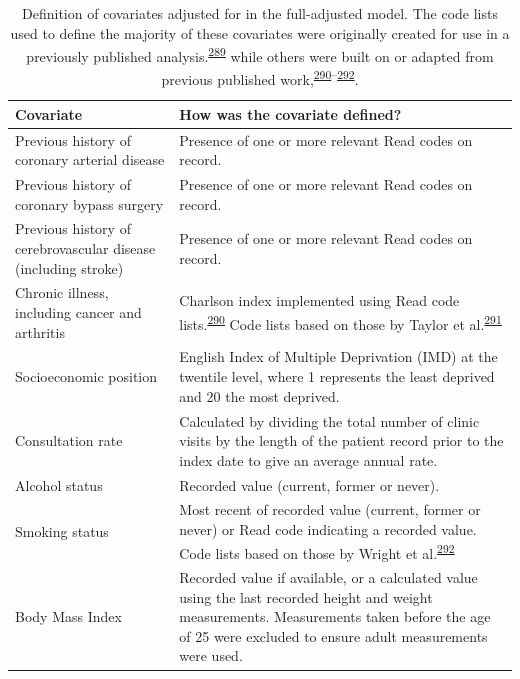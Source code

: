 \documentclass[a4paper, twoside]{templates/ociamthesis}
\begin{document}
\begin{table}[H]

\caption[Covariates adjusted for.]{\label{tab:covariateDef-table}Definition of covariates adjusted for in the full-adjusted model. The code lists used to define the majority of these covariates were originally created for use in a previously published analysis.\textsuperscript{\protect\hyperlink{ref-walker2020}{289}} while others were built on or adapted from previous published work,\textsuperscript{\protect\hyperlink{ref-khan2010}{290}--\protect\hyperlink{ref-wright2017}{292}}.}
\centering
\fontsize{9}{11}\selectfont
\begin{tabular}[t]{>{\raggedright\arraybackslash}p{15em}>{\centering\arraybackslash}p{25em}}
\toprule
\textbf{Covariate } & \textbf{How was the covariate defined?}\\
\midrule
Previous history of coronary arterial disease & Presence of one or more relevant Read codes on record.\\
\midrule
Previous history of coronary bypass surgery & Presence of one or more relevant Read codes on record.\\
\midrule
Previous history of cerebrovascular disease (including stroke) & Presence of one or more relevant Read codes on record.\\
\midrule
Chronic illness, including cancer and arthritis & Charlson index implemented using Read code lists.\textsuperscript{\protect\hyperlink{ref-khan2010}{290}} Code lists based on those by Taylor et al.\textsuperscript{\protect\hyperlink{ref-taylor2016}{291}}\\
\midrule
Socioeconomic position & 2010 English Index of Multiple Deprivation (IMD) at the twentile level, where 1 represents the least deprived and 20 the most deprived.\\
\midrule
\addlinespace
Consultation rate & Calculated by dividing the total number of clinic visits by the length of the patient record prior to the index date to give an average annual rate.\\
\midrule
Alcohol status & Recorded value (current, former or never).\\
\midrule
Smoking status & Most recent of recorded value (current, former or never) or Read code indicating a recorded value. Code lists based on those by Wright et al.\textsuperscript{\protect\hyperlink{ref-wright2017}{292}}\\
\midrule
Body Mass Index & Recorded value if available, or a calculated value using the last recorded height and weight measurements. Measurements taken before the age of 25 were excluded to ensure adult measurements were used.\\

\end{tabular}
\end{table}
\end{document}
